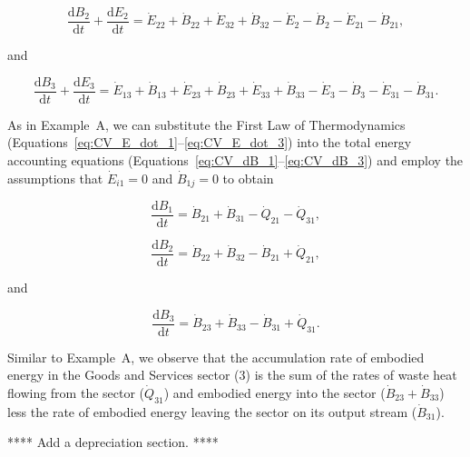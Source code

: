 \begin{equation} \label{eq:CV_dB_2}
	\frac{\mathrm{d}B_{2}}{\mathrm{d}t} 
	+ \frac{\mathrm{d}E_{2}}{\mathrm{d}t} 
	= \dot{E}_{22}
	+ \dot{B}_{22}
	+ \dot{E}_{32} 
	+ \dot{B}_{32} 
	- \dot{E}_2
	- \dot{B}_2
	- \dot{E}_{21} 
	- \dot{B}_{21},
\end{equation}

\noindent and 

\begin{equation} \label{eq:CV_dB_3}
	\frac{\mathrm{d}B_{3}}{\mathrm{d}t} 
	+ \frac{\mathrm{d}E_{3}}{\mathrm{d}t} 
	= \dot{E}_{13} 
	+ \dot{B}_{13} 
	+ \dot{E}_{23}
	+ \dot{B}_{23}
	+ \dot{E}_{33} 
	+ \dot{B}_{33} 
	- \dot{E}_{3} 
	- \dot{B}_{3} 
	- \dot{E}_{31} 
	- \dot{B}_{31}.
\end{equation}

As in Example~A, we can substitute the First Law of Thermodynamics 
(Equations~\ref{eq:CV_E_dot_1}--\ref{eq:CV_E_dot_3})
into the total energy accounting equations
(Equations~\ref{eq:CV_dB_1}--\ref{eq:CV_dB_3}) 
and employ the assumptions that 
$\dot{E}_{i1} = 0$ and
$\dot{B}_{1j} = 0$ 
to obtain

\begin{equation} \label{eq:B_embodied_energy_accounting_1}
	\frac{\mathrm{d}B_{1}}{\mathrm{d}t} 
	= \dot{B}_{21} 
	+ \dot{B}_{31} 
	- \dot{Q}_{21} 
	- \dot{Q}_{31}, 
\end{equation}

\begin{equation} \label{eq:B_embodied_energy_accounting_2}
	\frac{\mathrm{d}B_{2}}{\mathrm{d}t} 
	= \dot{B}_{22} 
	+ \dot{B}_{32} 
	- \dot{B}_{21}
	+ \dot{Q}_{21},
\end{equation}

\noindent and

\begin{equation} \label{eq:B_embodied_energy_accounting_3}
	\frac{\mathrm{d}B_3}{\mathrm{d}t} 
	= \dot{B}_{23} 
	+ \dot{B}_{33} 
	- \dot{B}_{31} 
	+ \dot{Q}_{31}.
\end{equation}

Similar to Example~A, we observe that the accumulation rate 
of embodied energy in the Goods and Services sector (3) 
is the sum of the rates of waste heat flowing from the sector 
($\dot{Q}_{31}$) and embodied energy into the sector 
($\dot{B}_{23} + \dot{B}_{33}$) 
less the rate of embodied energy leaving the sector 
on its output stream ($\dot{B}_{31}$).

**** Add a depreciation section. ****

